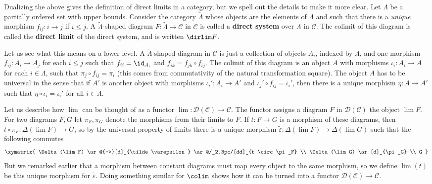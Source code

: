 \begin{example}
Dualizing the above gives the definition of direct limits in a category, but we spell out the details to make it more clear. Let $\Lambda$ be a partially ordered set with upper bounds. Consider the category $\underrightarrow\Lambda$ whose objects are the elements of $\Lambda$ and such that there is a \emph{unique} morphism $f_{ij} : i \rightarrow j$ if $i \leq j$. A $\underrightarrow\Lambda$-shaped diagram $F : \underrightarrow\Lambda \rightarrow \mathscr C$ in $\mathscr C$ is called a \textbf{direct system} over $\Lambda$ in $\mathscr C$. The colimit of this diagram is called the \textbf{direct limit} of the direct system, and is written $\dirlim F$. 

Let us see what this means on a lower level. A $\underrightarrow\Lambda$-shaped diagram in $\mathscr C$ is just a collection of objects $A_i$, indexed by $\Lambda$, and one morphism $f_{ij} : A_i \rightarrow A_j$ for each $i \leq j$ such that $f_{ii} = \id_{A_i}$ and $f_{ik} = f_{jk} \circ f_{ij}$. The colimit of this diagram is an object $A$ with morphisms $\iota_i : A_i \rightarrow A$ for each $i \in \Lambda$, such that $\pi_j \circ f_{ij} = \pi_i$ (this comes from commutativity of the natural transformation square). The object $A$ has to be universal in the sense that if $A'$ is another object with morphisms $\iota_i' : A_i \rightarrow A'$ and $\iota_j' \circ f_{ij} = \iota_i'$, then there is a unique morphism $\eta : A \rightarrow A'$ such that $\eta \circ \iota_i = \iota_i'$ for all $i \in \Lambda$. 
\end{example}


Let us describe how $\lim$ can be thought of as a functor $\lim : \mathscr D(\mathscr C) \rightarrow \mathscr C$. The functor assigns a diagram $F$ in $\mathscr D(\mathscr C)$ the object $\lim F$. For two diagrams $F,G$ let $\pi_F,\pi_G$ denote the morphisms from their limits to $F$. If $t : F \rightarrow G$ is a morphism of these diagrams, then $t \circ \pi_F : \Delta(\lim F) \rightarrow G$, so by the universal property of limits there is a unique morphism $\tilde\varepsilon : \Delta(\lim F) \rightarrow \Delta(\lim G)$ such that the following commutes
\[
\xymatrix
{
	\Delta(\lim F) \ar@{-->}[d]_{\tilde\varepsilon} \ar@/_2.3pc/[dd]_{t \circ \pi_F} \\
	\Delta(\lim G) \ar[d]_{\pi_G} \\
	G
}
\]
But we remarked earlier that a morphism between constant diagrams must map every object to the same morphism, so we define $\lim(t)$ be this unique morphism for $\tilde\varepsilon$. Doing something similar for $\colim$ shows how it can be turned into a functor $\mathscr D(\mathscr C) \rightarrow \mathscr C$. 

